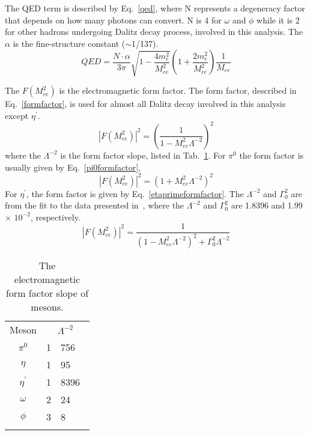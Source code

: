 The QED term is described by Eq.~\ref{qed}, where N represents a degeneracy factor that depends on how many photons can convert. N is 4 for $\omega$ and $\phi$ while it is 2 for other hadrons undergoing Dalitz decay process, involved in this analysis. The $\alpha$ is the fine-structure constant ($\sim$1/137).
\begin{equation}
QED =  \frac{N \cdot \alpha}{3\pi}\sqrt{1-\frac{4m_{e}^{2}}{M_{ee}^{2}}}\left(1 + \frac{2m_{e}^{2}}{M_{ee}^{2}}\right)\frac{1}{M_{ee}}
\label{qed}
\end{equation}

The $F(M_{ee}^{2})$ is the electromagnetic form factor. The form factor, described in Eq.~\ref{formfactor}, is used for almost all Dalitz decay involved in this analysis except $\eta^{\prime}$. 
 \begin{equation}
|F(M_{ee}^{2})|^{2} =  \left(\frac{1}{1 - M_{ee}^{2}\Lambda^{-2}}\right)^{2}
\label{formfactor}
\end{equation}
where the $\Lambda^{-2}$ is the form factor slope, listed in Tab.~\ref{inverselambdasquare}. For $\pi^{0}$ the form factor is usually given by Eq.~\ref{pi0formfactor},
 \begin{equation}
|F(M_{ee}^{2})|^{2} =  \left(1 + M_{ee}^{2}\Lambda^{-2}\right)^{2}
\label{pi0formfactor}
\end{equation}
For $\eta^{\prime}$, the form factor is given by Eq.~\ref{etaprimeformfactor}. The $\Lambda^{-2}$ and $\Gamma_{0}^{2}$ are from the fit to the data presented in~\cite{etaprimeInvLamSqu}, where the $\Lambda^{-2}$ and $\Gamma_{0}^{2}$ are 1.8396 and 1.99 $\times$ $10^{-2}$, respectively. 
 \begin{equation}
|F(M_{ee}^{2})|^{2} =  \frac{1}{(1 - M_{ee}^{2}\Lambda^{-2})^{2} + \Gamma_{0}^{2}\Lambda^{-2}}
\label{etaprimeformfactor}
\end{equation}

\begin{table}[htp]
\centering
\caption{The electromagnetic form factor slope of mesons.}
\label{inverselambdasquare}
\begin{tabular}{cr@{.}l}
\Xhline{1.6pt}
Meson & \multicolumn{2}{c}{$\Lambda^{-2}$} \\
\Xhline{1.2pt}
 $\pi^{0}$ & 1&756~\cite{pi0InvLamSqu} \\
 $\eta$ & 1&95~\cite{etaomegaInvLamSqu} \\
 $\eta^{\prime}$ & 1&8396~\cite{etaprimeInvLamSqu}\\
 $\omega$ & 2&24~\cite{etaomegaInvLamSqu} \\
 $\phi$ & 3&8~\cite{phiInvLamSqu} \\
\Xhline{1.6pt}
\end{tabular}
\end{table}

